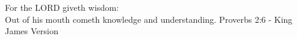 \vspace*{\fill}
\begin{flushright}
    \begin{minipage}{.7\textwidth}
    For the LORD giveth wisdom: \\
    Out of his mouth cometh knowledge and understanding.
        \newline
         Proverbs 2:6 - King James Version
    \end{minipage}
\end{flushright}
\thispagestyle{empty}